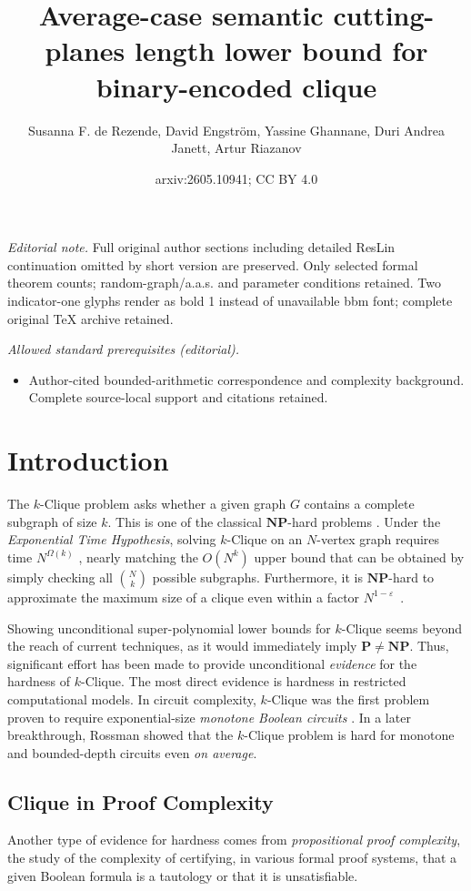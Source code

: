\documentclass[10pt,a4paper]{article}
\title{Average-case semantic cutting-planes length lower bound for binary-encoded clique}
\author{Susanna F. de Rezende, David Engström, Yassine Ghannane, Duri Andrea Janett, Artur Riazanov}
\date{arxiv:2605.10941; CC BY 4.0}
\theoremstyle{definition}
\theoremstyle{remark}
\theoremstyle{example}
\theoremstyle{plain}
\newcommand{\NP}{\mathbf{NP}}
\newcommand{\graphSize}{N}
\newcommand{\kClique}{$k$-\textsf{Clique}\xspace}
\begin{document}
\maketitle
\noindent\textit{Editorial note.} Full original author sections including detailed ResLin continuation omitted by short version are preserved. Only selected formal theorem counts; random-graph/a.a.s. and parameter conditions retained. Two indicator-one glyphs render as bold 1 instead of unavailable bbm font; complete original TeX archive retained.\par\medskip
\noindent\textit{Allowed standard prerequisites (editorial).}\begin{itemize}
\item Author-cited bounded-arithmetic correspondence and complexity background. Complete source-local support and citations retained.
\end{itemize}\medskip
\section{Introduction}
\label{sec:introduction}

The \kClique problem asks whether a given graph $G$ contains 
a complete subgraph of size $k$.
This is one of the classical $\NP$-hard problems \cite{Karp1972}.
Under the \emph{Exponential Time Hypothesis},
solving \kClique on an $\graphSize$-vertex graph requires time $\graphSize^{\Omega(k)}$ \cite{CHKX04approx}, nearly matching the $O(\graphSize^k)$ upper bound that can be obtained by simply checking all $\binom{\graphSize}{k}$ possible subgraphs.
Furthermore, it is $\NP$-hard to approximate the maximum size of a clique even within a factor $\graphSize^{1-\varepsilon}$~\cite{haastad1999clique, Zuckerman07}.

Showing unconditional super-polynomial lower bounds for \kClique seems beyond the reach of current techniques, as it would immediately imply $\mathbf{P} \neq \NP$. Thus, significant effort has been made to provide unconditional \emph{evidence} for the hardness of \kClique. The most direct evidence is hardness in restricted computational models. 
In circuit complexity, 
\kClique was the first 
problem proven to require exponential-size \emph{monotone Boolean circuits} \cite{Razborov1985}. 
In a later breakthrough, Rossman \cite{Rossman08ConstantDepth, Rossman14Monotone} showed 
that the \kClique problem is hard for monotone and bounded-depth circuits even \emph{on average}. 
\subsection{Clique in Proof Complexity}
Another type of evidence for hardness comes from \emph{propositional proof complexity},
the study of 
the complexity of certifying, in various formal proof systems, that a given Boolean formula is a tautology or that it is unsatisfiable.
\end{document}
